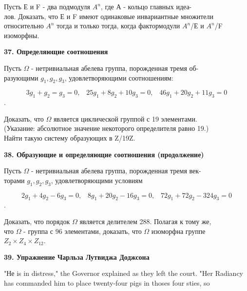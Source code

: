 \medskip

Пусть Е и F - два подмодуля $A^n$, где А - кольцо главных 
идеа-\\лов. Доказать, что Е и F имеют одинаковые инвариантные множители 
относительно $A^n$ тогда и только тогда, когда фактормодули $A^n$/Е и 
$A^n$/F изоморфны. 

\medskip

{\noindent\bf37. Определяющие соотношения }

\medskip

Пусть $\Omega$ - нетривиальная абелева группа, порожденная тремя
об-\\разующими $g_1,g_2,g_3$, удовлетворяющими соотношениям: 


$$ 3g_1+g_2=g_3=0,\;\;\; 25g_1+8g_2+10g_3=0,\;\;\;46g_1+20g_2+11g_3=0 $$. 


Доказать, что $\Omega$ является циклической группой с 19 элементами.\\ 
(Указание: абсолютное значение некоторого определителя равно 19.)\\ 
Найти такую систему образующих в Z/19Z. 

\medskip

{\noindent\bf38. Образующие и определяющие соотношения (продолжение) }

\medskip

Пусть $\Omega$ - нетривиальная абелева группа, порожденная тремя
век-\\торами $g_1,g_2,g_3$, удовлетворяющими условиям 


$$ 2g_1+4g_2-6g_3=0,\;\;\; 8g_1+20g_2-16g_3=0,\;\;\;72g_1+72g_2-324g_3=0 $$. 


Доказать, что порядок $\Omega$ является делителем 288. Полагая к тому же, \\
что $\Omega$ - группа с 96 элементами, доказать, что $\Omega$ изоморфна группе\\ 
$Z_2\times Z_4\times Z_12 $. 

\medskip

{\noindent\bf39. Упражнение Чарльза Лутвиджа Доджсона }

\medskip

"Не is in distress," the Governor explained as they left the court. "Her 
Radiancy has commanded him to place twenty-four pigs in thoses four sties, so



%
